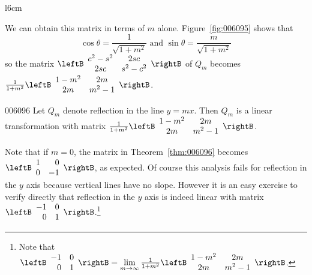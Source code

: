 \begin{wrapfigure}{l}{6cm} 
	\centering
   	
	\caption{\label{fig:006095}}
\end{wrapfigure}

We can obtain this matrix in terms of $m$ alone. Figure~\ref{fig:006095} shows that
\begin{equation*}
\cos \theta = \frac{1}{\sqrt{1 + m^2}} \mbox{ and } \sin \theta = \frac{m}{\sqrt{1 + m^2}}
\end{equation*}
so the matrix $\leftB \begin{array}{cc}
c^2 - s^2 & 2sc \\
2sc & s^2 - c^2
\end{array} \rightB$
 of $Q_{m}$ becomes $\frac{1}{1 + m^2}\leftB \begin{array}{cc}
 1 - m^2 & 2m \\
 2m & m^2 - 1
 \end{array} \rightB$.
\vspace{1em}

\begin{theorem}{}{006096}
Let $Q_{m}$ denote reflection in the line $y = mx$. Then $Q_{m}$ is a linear transformation with matrix $\frac{1}{1 + m^2}\leftB \begin{array}{cc}
1 - m^2 & 2m \\
2m & m^2 - 1
\end{array} \rightB$.
\end{theorem}

Note that if $m = 0$, the matrix in Theorem~\ref{thm:006096} becomes $\leftB \begin{array}{rr}
1 & 0 \\
0 & -1
\end{array}\rightB$,
 as expected. Of course this analysis fails for reflection in the $y$ axis because vertical lines have no slope. However it is an easy exercise to verify directly that reflection in the $y$ axis is indeed linear with matrix $\leftB \begin{array}{rr}
 -1 & 0 \\
 0 & 1
 \end{array}\rightB$.\footnote{Note that $\leftB \begin{array}{rr}
 	-1 & 0 \\
 	0 & 1
 	\end{array}\rightB = \lim\limits_{m \to \infty}\frac{1}{1 + m^2} \leftB \begin{array}{cc}
 	1 - m^2 & 2m \\
 	2m & m^2 - 1
 	\end{array} \rightB$.}

